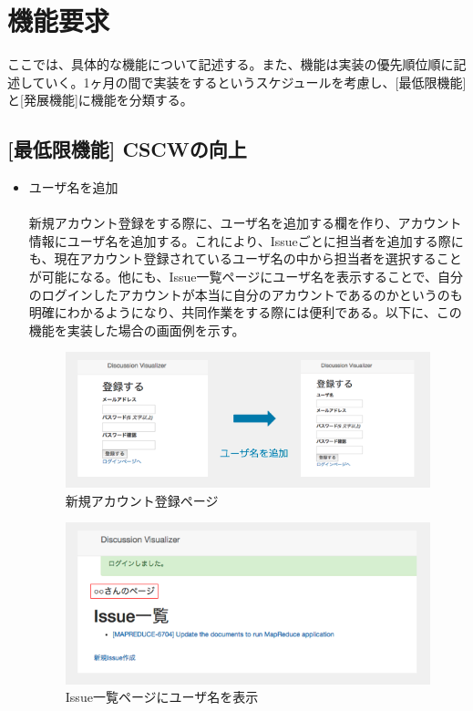 \documentclass[12pt, oneside]{jreport}
\begin{document}
	
	\section{機能要求}
	ここでは、具体的な機能について記述する。また、機能は実装の優先順位順に記述していく。1ヶ月の間で実装をするというスケジュールを考慮し、[最低限機能]と[発展機能]に機能を分類する。
	
		\subsection{[最低限機能] CSCWの向上}
		\begin{itemize}
			\item ユーザ名を追加
			\\ \\
			新規アカウント登録をする際に、ユーザ名を追加する欄を作り、アカウント情報にユーザ名を追加する。これにより、Issueごとに担当者を追加する際にも、現在アカウント登録されているユーザ名の中から担当者を選択することが可能になる。他にも、Issue一覧ページにユーザ名を表示することで、自分のログインしたアカウントが本当に自分のアカウントであるのかというのも明確にわかるようになり、共同作業をする際には便利である。以下に、この機能を実装した場合の画面例を示す。
			
			\begin{figure}[H]
			\centering
			\includegraphics[width=17cm,bb=520 300 -200 27]{UserName1.png}
			\caption{新規アカウント登録ページ}
			\end{figure}
			
			\begin{figure}[H]
			\centering
			\includegraphics[width=17cm,bb=400 300 -200 27]{UserName2.png}
			\caption{Issue一覧ページにユーザ名を表示}
			\end{figure}
		

\end{itemize}
\end{document}
